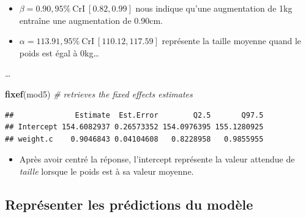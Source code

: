 \documentclass[
  a4paper,11pt,twoside,onecolumn,openright,final,oldfontcommands]{memoir}
\newenvironment{Shaded}{\begin{snugshade}}{\end{snugshade}}
\newcommand{\CommentTok}[1]{\textcolor[rgb]{0.56,0.35,0.01}{\textit{#1}}}
\newcommand{\DataTypeTok}[1]{\textcolor[rgb]{0.13,0.29,0.53}{#1}}
\newcommand{\DecValTok}[1]{\textcolor[rgb]{0.00,0.00,0.81}{#1}}
\newcommand{\KeywordTok}[1]{\textcolor[rgb]{0.13,0.29,0.53}{\textbf{#1}}}
\newcommand{\NormalTok}[1]{#1}
\newcommand{\OperatorTok}[1]{\textcolor[rgb]{0.81,0.36,0.00}{\textbf{#1}}}
\newcommand{\StringTok}[1]{\textcolor[rgb]{0.31,0.60,0.02}{#1}}
\providecommand{\tightlist}{%
  \setlength{\itemsep}{0pt}\setlength{\parskip}{0pt}}
\theoremstyle{definition}
\theoremstyle{definition}
\theoremstyle{definition}
\theoremstyle{remark}
\begin{document}
\begin{itemize}
\tightlist
\item
  \(\beta = 0.90, 95\% \ \text{CrI} \ [0.82, 0.99]\) nous indique qu'une augmentation de 1kg entraîne une augmentation de 0.90cm.
\item
  \(\alpha = 113.91, 95\% \ \text{CrI} \ [110.12, 117.59]\) représente la taille moyenne quand le poids est égal à 0kg\ldots{}
\end{itemize}

\ldots{}

\begin{Shaded}
\end{Shaded}

\begin{Shaded}
\begin{Highlighting}[]
\KeywordTok{fixef}\NormalTok{(mod5) }\CommentTok{\# retrieves the fixed effects estimates}
\end{Highlighting}
\end{Shaded}

\begin{verbatim}
##              Estimate  Est.Error        Q2.5       Q97.5
## Intercept 154.6082937 0.26573352 154.0976395 155.1280925
## weight.c    0.9046843 0.04104608   0.8228958   0.9855955
\end{verbatim}

\begin{itemize}
\tightlist
\item
  Après avoir centré la réponse, l'intercept représente la valeur attendue de \emph{taille} lorsque le poids est à sa valeur moyenne.
\end{itemize}

\hypertarget{repruxe9senter-les-pruxe9dictions-du-moduxe8le}{%
\subsection{Représenter les prédictions du modèle}\label{repruxe9senter-les-pruxe9dictions-du-moduxe8le}}
\end{document}
